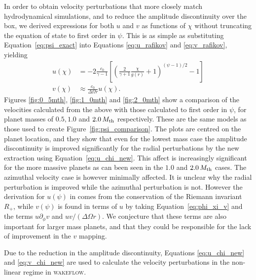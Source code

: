 In order to obtain velocity perturbations that more closely match hydrodynamical simulations, and to reduce the amplitude discontinuity over the box, we derived expressions for both $u$ and $v$ as functions of $\chi$ without truncating the equation of state to first order in $\psi$. 
This is as simple as substituting Equation~\eqref{eq:psi_exact} into Equations \eqref{eq:u_rafikov} and \eqref{eq:v_rafikov}, yielding
\begin{align}
    u(\chi) &= -2 \frac{c_0}{\gamma - 1} \left[ \left( \frac{2}{\gamma + 1} \frac{\chi}{g(r)} +1  \right)^{(\psi-1)/2} -1 \right] \label{eq:u_chi_new} \\
    v(\chi) &\approx \frac{c_0}{\Delta\Omega r} u (\chi). \label{eq:v_chi_new} 
\end{align}
Figures \ref{fig:0_5mth}, \ref{fig:1_0mth} and \ref{fig:2_0mth} show a comparison of the velocities calculated from the above with those calculated to first order in $\psi$, for planet masses of $0.5, 1.0$ and $2.0 \, M_{\rm th}$ respectively. 
These are the same models as those used to create Figure~\ref{fig:psi_comparison}. 
The plots are centred on the planet location, and they show that even for the lowest mass case the amplitude discontinuity is improved significantly for the radial perturbations by the new extraction using Equation~\eqref{eq:u_chi_new}. 
This affect is increasingly significant for the more massive planets as can been seen in the $1.0$ and $2.0 \, M_{\rm th}$ cases. The azimuthal velocity case is however minimally affected. 
It is unclear why the radial perturbation is improved while the azimuthal perturbation is not.
However the derivation for $u(\psi)$ in \citet{rafikov2002a} comes from the conservation of the Riemann invariant $R_+$, while $v(\psi)$ is found in terms of $u$ by taking Equation~\eqref{eq:phi_xi_v} and the terms $u \partial_\phi v$ and $u v / (\Delta \Omega r)$.
We conjecture that these terms are also important for larger mass planets, and that they could be responsible for the lack of improvement in the $v$ mapping.

Due to the reduction in the amplitude discontinuity, Equations \eqref{eq:u_chi_new} and \eqref{eq:v_chi_new} are used to calculate the velocity perturbations in the non-linear regime in \textsc{wakeflow}. 

